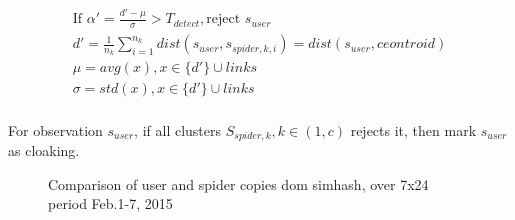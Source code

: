 \begin{equation}
  \label{coefficient:detect}
  \begin{gathered}
    \text {If } \alpha' = \frac{d' - \mu}{\sigma} > T_{detect}, \text{reject } s_{user} \\
    d' = \frac{1}{n_k}\sum_{i=1}^{n_k} dist(s_{user}, s_{spider, k, i}) =
    dist(s_{user}, ceontroid) \\ 
    \mu = avg(x), x \in  \{d'\} \cup links \\
    \sigma = std(x), x \in \{d'\} \cup links \\
  \end{gathered}
\end{equation}

For observation $s_{user}$, if all clusters $S_{spider, k}, k \in (1, c)$ rejects it, then
mark $s_{user}$ as cloaking.

\begin{figure}[t]
  \centering
  \caption{Comparison of user and spider copies dom simhash, over 7x24 period Feb.1-7, 2015}
  \label{fig:google-simhash}
\end{figure}

